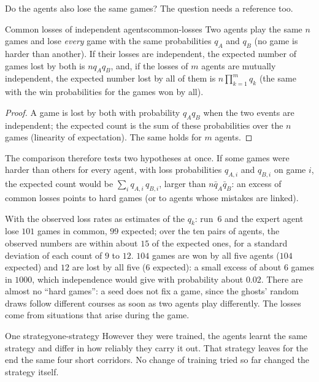 Do the agents also lose the same games? The question needs a reference too.

\begin{proposition}{Common losses of independent agents}{common-losses}
  Two agents play the same $n$ games and lose \emph{every} game with the
  same probabilities $q_A$ and $q_B$ (no game is harder than another). If
  their losses are independent, the expected number of games lost by both
  is $n q_A q_B$, and, if the losses of $m$ agents are mutually
  independent, the expected number lost by all of them is
  $n \prod_{k=1}^m q_k$ (the same with the win probabilities for the games
  won by all).
\end{proposition}

\begin{proof}
  A game is lost by both with probability $q_A q_B$ when the two events are
  independent; the expected count is the sum of these probabilities over the
  $n$ games (linearity of expectation). The same holds for $m$ agents.
\end{proof}

The comparison therefore tests two hypotheses at once. If some games were
harder than others for every agent, with loss probabilities $q_{A,i}$ and
$q_{B,i}$ on game $i$, the expected count would be $\sum_i q_{A,i}\,
q_{B,i}$, larger than $n \bar q_A \bar q_B$: an excess of common losses
points to hard games (or to agents whose mistakes are linked).

With the observed loss rates as estimates of the $q_k$: run~6 and the expert
agent lose $101$ games in common, $99$ expected; over the ten pairs of
agents, the observed numbers are within about $15$ of the expected ones,
for a standard deviation of each count of $9$ to $12$. $104$ games are won
by all five agents ($104$ expected) and $12$ are lost by all five ($6$
expected): a small excess of about $6$ games in $1000$, which independence
would give with probability about $0.02$. There are almost no ``hard
games'': a seed does not
fix a game, since the ghosts' random draws follow different courses as soon
as two agents play differently. The losses come from situations that arise
during the game.

\begin{pacman}{One strategy}{one-strategy}
  However they were trained, the agents learnt the same strategy and differ
  in how reliably they carry it out. That strategy leaves for the end the
  same four short corridors. No change of
  training tried so far changed the strategy itself.
\end{pacman}

